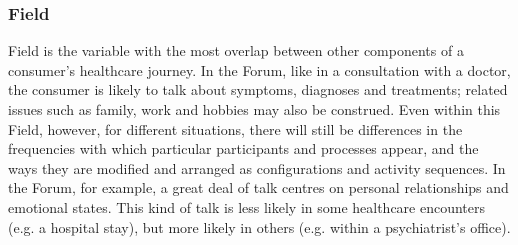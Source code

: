 

\subsubsection{Field}

Field is the variable with the most overlap between other components of a consumer's healthcare journey. In the \gls{Forum}, like in a consultation with a doctor, the consumer is likely to talk about symptoms, diagnoses and treatments; related issues such as family, work and hobbies may also be construed. Even within this Field, however, for different situations, there will still be differences in the frequencies with which particular participants and processes appear, and the ways they are modified and arranged as configurations and activity sequences. In the Forum, for example, a great deal of talk centres on personal relationships and emotional states. This kind of talk is less likely in some healthcare encounters (e.g. a hospital stay), but more likely in others (e.g. within a psychiatrist's office).

